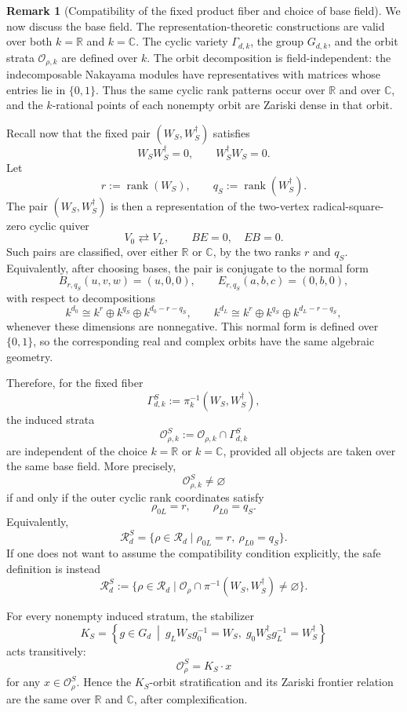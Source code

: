 \documentclass[11pt]{article}
\theoremstyle{definition}
\newtheorem{remark}[theorem]{Remark}
\begin{document}
\begin{remark}[Compatibility of the fixed product fiber and choice of base field]
\label{rem:base-field-and-fixed-fiber}
We now discuss the base field. The representation-theoretic constructions are
valid over both \(k=\mathbb R\) and \(k=\mathbb C\). The cyclic variety
\(\Gamma_{d,k}\), the group \(G_{d,k}\), and the orbit strata
\(\mathcal O_{\rho,k}\) are defined over \(k\). The orbit decomposition is
field-independent: the indecomposable Nakayama modules have representatives
with matrices whose entries lie in \(\{0,1\}\). Thus the same cyclic rank
patterns occur over \(\mathbb R\) and over \(\mathbb C\), and the
\(k\)-rational points of each nonempty orbit are Zariski dense in that orbit.

Recall now that the fixed pair \((W_S,W_S^{\dagger})\) satisfies
\[
W_S W_S^{\dagger}=0,
\qquad
W_S^{\dagger}W_S=0.
\]
Let
\[
r:=\operatorname{rank}(W_S),
\qquad
q_S:=\operatorname{rank}(W_S^{\dagger}).
\]
The pair \((W_S,W_S^{\dagger})\) is then a representation of the two-vertex
radical-square-zero cyclic quiver
\[
V_0 \rightleftarrows V_L,
\qquad
BE=0,\quad EB=0.
\]
Such pairs are classified, over either \(\mathbb R\) or \(\mathbb C\), by the
two ranks \(r\) and \(q_S\). Equivalently, after choosing bases, the pair is
conjugate to the normal form
\[
B_{r,q_S}(u,v,w)=(u,0,0),
\qquad
E_{r,q_S}(a,b,c)=(0,b,0),
\]
with respect to decompositions
\[
k^{d_0}\cong k^r\oplus k^{q_S}\oplus k^{d_0-r-q_S},
\qquad
k^{d_L}\cong k^r\oplus k^{q_S}\oplus k^{d_L-r-q_S},
\]
whenever these dimensions are nonnegative. This normal form is defined over
\(\{0,1\}\), so the corresponding real and complex orbits have the same
algebraic geometry.

Therefore, for the fixed fiber
\[
\Gamma_{d,k}^S:=\pi_k^{-1}(W_S,W_S^{\dagger}),
\]
the induced strata
\[
\mathcal O_{\rho,k}^S
:=
\mathcal O_{\rho,k}\cap \Gamma_{d,k}^S
\]
are independent of the choice \(k=\mathbb R\) or \(k=\mathbb C\), provided
all objects are taken over the same base field. More precisely,
\[
\mathcal O_{\rho,k}^S\neq\varnothing
\]
if and only if the outer cyclic rank coordinates satisfy
\[
\rho_{0L}=r,
\qquad
\rho_{L0}=q_S.
\]
Equivalently,
\[
\mathcal R_d^S
=
\{\rho\in\mathcal R_d\mid
\rho_{0L}=r,\ \rho_{L0}=q_S\}.
\]
If one does not want to assume the compatibility condition explicitly, the
safe definition is instead
\[
\mathcal R_d^S
:=
\{\rho\in\mathcal R_d\mid
\mathcal O_\rho\cap \pi^{-1}(W_S,W_S^{\dagger})\neq\varnothing\}.
\]

For every nonempty induced stratum, the stabilizer
\[
K_S
=
\left\{
g\in G_d
\ \middle|\
g_L W_Sg_0^{-1}=W_S,\;
g_0 W_S^{\dagger}g_L^{-1}=W_S^{\dagger}
\right\}
\]
acts transitively:
\[
\mathcal O_\rho^S
=
K_S\cdot x
\]
for any \(x\in\mathcal O_\rho^S\). Hence the \(K_S\)-orbit stratification and
its Zariski frontier relation are the same over \(\mathbb R\) and
\(\mathbb C\), after complexification.


\end{remark}
\end{document}
